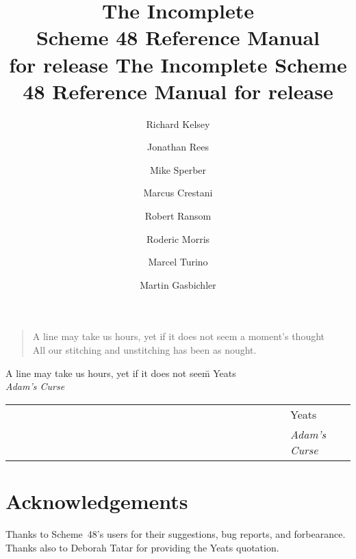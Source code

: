 \documentclass[twoside]{report}
\begin{document}
\frontmatter
\label{top_node}

\texonly
\title{{\large The Incomplete} \\ Scheme 48 Reference Manual \\
 {\large for release }}
\endtexonly
\htmlonly
\title{The Incomplete Scheme 48 Reference Manual for release }
\endhtmlonly
\author{Richard Kelsey \and Jonathan Rees \and Mike Sperber
  \and Marcus Crestani \and Robert Ransom \and Roderic Morris \and
  Marcel Turino \and Martin Gasbichler}
\date{}

\maketitle

\begin{verse}
A line may take us hours, yet if it does not seem a moment's thought \\
All our stitching and unstitching has been as nought.
\end{verse}
\texonly
\begin{tabbing}
A line may take us hours, yet if it does not seem\= \kill
\> Yeats \\
\> {\em Adam's Curse}
\end{tabbing}
\endtexonly
\htmlonly
\begin{tabular}{ll}
~~~~~~~~~~~~~~~~~~~~~~~~~~~~~~~~~~~~~~~~~~~~~~~~~ & Yeats \\
& {\em Adam's Curse}
\end{tabular}
\endhtmlonly

\chapter*{Acknowledgements}

Thanks to Scheme~48's users for their suggestions, bug reports,
  and forbearance.
Thanks also to Deborah Tatar for providing the Yeats quotation.

\tableofcontents

\texonly
\cleardoublepage{}\setcounter{page}{1}
\endtexonly

\mainmatter











\backmatter
\printindex
\end{document}
